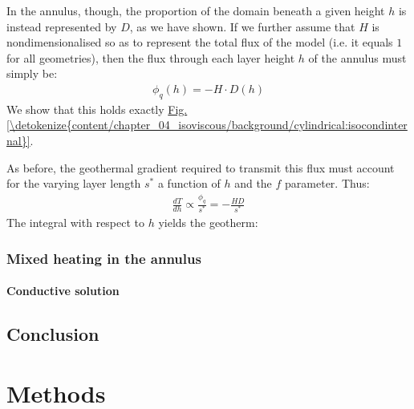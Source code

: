 \documentclass[letterpaper,10pt,english]{jupyterBook}
\begin{document}
\sphinxAtStartPar
In the annulus, though, the proportion of the domain beneath a given height \(h\) is instead represented by \(D\), as we have shown. If we further assume that \(H\) is non\sphinxhyphen{}dimensionalised so as to represent the total flux of the model (i.e. it equals \(1\) for all geometries), then the flux through each layer height \(h\) of the annulus must simply be:
\begin{equation*}
\begin{split}
{\phi_q}(h) = -H \cdot D(h)
\end{split}
\end{equation*}
\sphinxAtStartPar
We show that this holds exactly \hyperref[\detokenize{content/chapter_04_isoviscous/background/cylindrical:isocondinternal}]{Fig.\@ \ref{\detokenize{content/chapter_04_isoviscous/background/cylindrical:isocondinternal}}}.

\sphinxAtStartPar
As before, the geothermal gradient required to transmit this flux must account for the varying layer length \(s^{*}\) \sphinxhyphen{} a function of \(h\) and the \(f\) parameter. Thus:
\begin{equation*}
\begin{split}
\frac{dT}{dh} \propto \frac{\phi_q}{s^{*}} = -\frac{HD}{s^{*}}
\end{split}
\end{equation*}
\sphinxAtStartPar
The integral with respect to \(h\) yields the geotherm:


\subsubsection{Mixed heating in the annulus}
\label{\detokenize{content/chapter_04_isoviscous/background/cylindrical:mixed-heating-in-the-annulus}}

\paragraph{Conductive solution}
\label{\detokenize{content/chapter_04_isoviscous/background/cylindrical:id9}}

\subsection{Conclusion}
\label{\detokenize{content/chapter_04_isoviscous/background/conclusion:conclusion}}\label{\detokenize{content/chapter_04_isoviscous/background/conclusion::doc}}

\section{Methods}
\label{\detokenize{content/chapter_04_isoviscous/methods/intro:methods}}\label{\detokenize{content/chapter_04_isoviscous/methods/intro::doc}}
\end{document}
